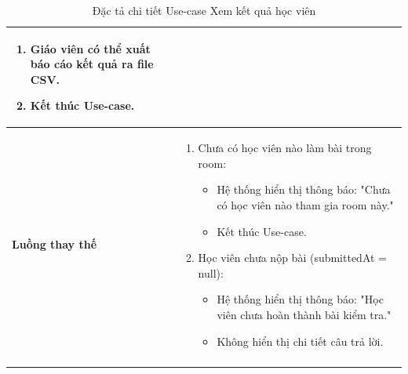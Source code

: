 \begin{longtable}{|p{}|p{}|}
\begin{enumerate}[topsep=2pt, itemsep=0pt]
\begin{itemize}[topsep=0pt, itemsep=0pt]
    \end{itemize}
    \item Giáo viên có thể xuất báo cáo kết quả ra file CSV.
    \item Kết thúc Use-case.
\end{enumerate} \\
\hline
\textbf{Luồng thay thế} &
\vspace{-\baselineskip}
\begin{enumerate}[topsep=2pt, itemsep=0pt]
    \item[3a.] Chưa có học viên nào làm bài trong room:
    \begin{itemize}[topsep=0pt, itemsep=0pt]
        \item Hệ thống hiển thị thông báo: "Chưa có học viên nào tham gia room này."
        \item Kết thúc Use-case.
    \end{itemize}
    \item[5a.] Học viên chưa nộp bài (submittedAt = null):
    \begin{itemize}[topsep=0pt, itemsep=0pt]
        \item Hệ thống hiển thị thông báo: "Học viên chưa hoàn thành bài kiểm tra."
        \item Không hiển thị chi tiết câu trả lời.
    \end{itemize}
\end{enumerate} \\
\hline
\caption{Đặc tả chi tiết Use-case Xem kết quả học viên}
\label{table:uc-view-results}
\end{longtable}

\clearpage

